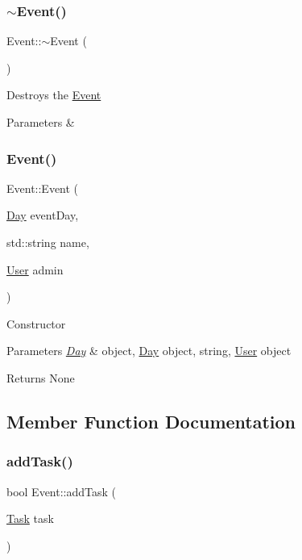 \subsubsection{\texorpdfstring{$\sim$\+Event()}{~Event()}}
{\footnotesize\ttfamily Event\+::$\sim$\+Event (\begin{DoxyParamCaption}{ }\end{DoxyParamCaption})}

Destroys the \mbox{\hyperlink{class_event}{Event}} 
\begin{DoxyParams}{Parameters}
{\em } & \\
\hline
\end{DoxyParams}
\mbox{\label{class_event_a7ce079bddd0e846a77933ba8d061e6a3}} 
\subsubsection{\texorpdfstring{Event()}{Event()}\hspace{0.1cm}{\footnotesize\ttfamily [2/2]}}
{\footnotesize\ttfamily Event\+::\+Event (\begin{DoxyParamCaption}\item[{\mbox{\hyperlink{class_day}{Day}}}]{event\+Day,  }\item[{std\+::string}]{name,  }\item[{\mbox{\hyperlink{class_user}{User}}}]{admin }\end{DoxyParamCaption})}

Constructor 
\begin{DoxyParams}{Parameters}
{\em \mbox{\hyperlink{class_day}{Day}}} & object, \mbox{\hyperlink{class_day}{Day}} object, string, \mbox{\hyperlink{class_user}{User}} object \\
\hline
\end{DoxyParams}
\begin{DoxyReturn}{Returns}
None 
\end{DoxyReturn}


\subsection{Member Function Documentation}
\mbox{\label{class_event_a919b26c4329be742b3effe58aa30ab02}} 
\subsubsection{\texorpdfstring{add\+Task()}{addTask()}}
{\footnotesize\ttfamily bool Event\+::add\+Task (\begin{DoxyParamCaption}\item[{\mbox{\hyperlink{class_task}{Task}}}]{task }\end{DoxyParamCaption})}

